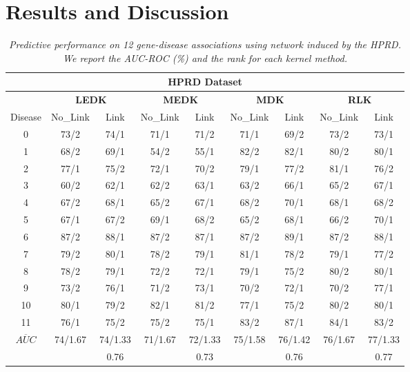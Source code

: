 \documentclass{article}
\begin{document}
\section{Results and Discussion}
\label{results-discussion}
\begin{table*}[b]
\centering
\begin{tabular}{|c|c|c|c|c|c|c|c|c|}
\hline
         \multicolumn{9}{|c|}{\textbf{HPRD Dataset}}\\
 \hline
 & \multicolumn{2}{c|}{\textbf{LEDK}} & \multicolumn{2}{c|}{\textbf{MEDK}} & \multicolumn{2}{c|}{\textbf{MDK}} & \multicolumn{2}{c|}{\textbf{RLK}} \\
 \hline
  Disease & No\_Link & Link & No\_Link & Link & No\_Link & Link & No\_Link & Link \\
 \hline
  0 & 73/2 & 74/1 & 71/1 & 71/2 & 71/1 & 69/2 & 73/2 & 73/1 \\

  1 & 68/2 & 69/1 & 54/2 & 55/1 & 82/2 & 82/1 & 80/2 & 80/1 \\

  2 & 77/1 & 75/2 & 72/1 & 70/2 & 79/1 & 77/2 & 81/1 & 76/2 \\

  3 & 60/2 & 62/1 & 62/2 & 63/1 & 63/2 & 66/1 & 65/2 & 67/1 \\

  4 & 67/2 & 68/1 & 65/2 & 67/1 & 68/2 & 70/1 & 68/1 & 68/2 \\

  5 & 67/1 & 67/2 & 69/1 & 68/2 & 65/2 & 68/1 & 66/2 & 70/1 \\

  6 & 87/2 & 88/1 & 87/2 & 87/1 & 87/2 & 89/1 & 87/2 & 88/1 \\

  7 & 79/2 & 80/1 & 78/2 & 79/1 & 81/1 & 78/2 & 79/1 & 77/2 \\

  8 & 78/2 & 79/1 & 72/2 & 72/1 & 79/1 & 75/2 & 80/2 & 80/1 \\

  9 & 73/2 & 76/1 & 71/2 & 73/1 & 70/2 & 72/1 & 70/2 & 77/1 \\

  10 & 80/1 & 79/2 & 82/1 & 81/2 & 77/1 & 75/2 & 80/2 & 80/1 \\

  11 & 76/1 & 75/2 & 75/2 & 75/1 & 83/2 & 87/1 & 84/1 & 83/2 \\

 \hline
  $\overline{AUC}$ & 74/1.67 & 74/1.33 & 71/1.67 & 72/1.33 & 75/1.58 & 76/1.42 & 76/1.67 & 77/1.33 \\
\hline
    & & 0.76 & & 0.73 & & 0.76 & & 0.77 \\
\hline
\end{tabular}
\caption{\textit {Predictive performance on 12 gene-disease associations using network induced by the HPRD. We report the AUC-ROC (\%) and the rank for each kernel method.}}
\label{table:results}
\end{table*}
\end{document}
